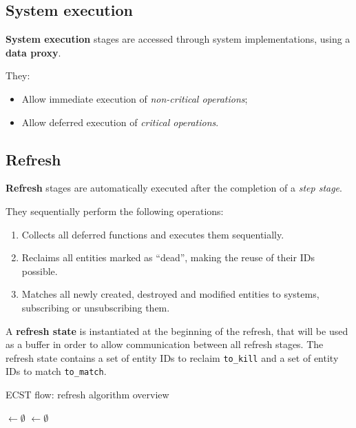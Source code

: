 \documentclass[twoside, 12pt, a4paper, openright]{book}
\begin{document}
\subsection{System execution}\label{system-execution}

\textbf{System execution} stages are accessed through system
implementations, using a \textbf{data proxy}.

They:

\begin{itemize}
\item
  Allow immediate execution of \emph{non-critical operations};
\item
  Allow deferred execution of \emph{critical operations}.
\end{itemize}

\hypertarget{flow_refresh}{\subsection{Refresh}\label{flow_refresh}}

\textbf{Refresh} stages are automatically executed after the completion
of a \emph{step stage}.

They sequentially perform the following operations:

\begin{enumerate}
\def\labelenumi{\arabic{enumi}.}
\item
  Collects all deferred functions and executes them sequentially.
\item
  Reclaims all entities marked as ``dead'', making the reuse of their
  IDs possible.
\item
  Matches all newly created, destroyed and modified entities to systems,
  subscribing or unsubscribing them.
\end{enumerate}

A \textbf{refresh state} is instantiated at the beginning of the
refresh, that will be used as a buffer in order to allow communication
between all refresh stages. The refresh state contains a set of entity
IDs to reclaim
\texttt{to_kill}
and a set of entity IDs to match
\texttt{to_match}.

\begin{algorithm}[H]
\caption{ECST flow: refresh algorithm overview}
\footnotesize


    \ToKill $\longleftarrow \emptyset$\;
    \ToMatch $\longleftarrow \emptyset$\;
    \BlankLine
    \ExecuteDeferredFunctions{\ToKill, \ToMatch} 
    \ReclaimDeadEntities{\ToKill} 
    \MatchEntitiesToSystems{\ToMatch} 

\end{algorithm}
\end{document}
